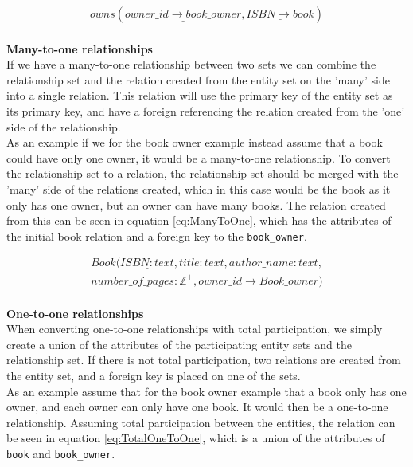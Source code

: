 \begin{equation}\label{eq:ManyToMany}
    \begin{split}
        owns(\underline{owner\_id \rightarrow book\_owner}, \underline{ISBN \rightarrow book})
    \end{split}
\end{equation}
\\
\textbf{Many-to-one relationships}\\
If we have a many-to-one relationship between two sets we can combine the relationship set and the relation created from the entity set on the 'many' side into a single relation. This relation will use the primary key of the entity set as its primary key, and have a foreign referencing the relation created from the 'one' side of the relationship.\\
As an example if we for the book owner example instead assume that a book could have only one owner, it would be a many-to-one relationship. To convert the relationship set to a relation, the relationship set should be merged with the 'many' side of the relations created, which in this case would be the book as it only has one owner, but an owner can have many books. The relation created from this can be seen in equation \ref*{eq:ManyToOne}, which has the attributes of the initial book relation and a foreign key to the \texttt{book\_owner}.

\begin{equation}\label{eq:ManyToOne}
    \begin{split}
        Book(\underline{ISBN : text} , title : text , author\_name : text , \\number\_of\_pages : \mathbb{Z}^+, owner\_id \rightarrow Book\_owner)
    \end{split}
\end{equation}
\\
\textbf{One-to-one relationships}\\
When converting one-to-one relationships with total participation, we simply create a union of the attributes of the participating entity sets and the relationship set\cite{DBSBook}. If there is not total participation, two relations are created from the entity set, and a foreign key is placed on one of the sets.\\
As an example assume that for the book owner example that a book only has one owner, and each owner can only have one book. It would then be a one-to-one relationship. Assuming total participation between the entities, the relation can be seen in equation \ref*{eq:TotalOneToOne}, which is a union of the attributes of \texttt{book} and \texttt{book\_owner}.

